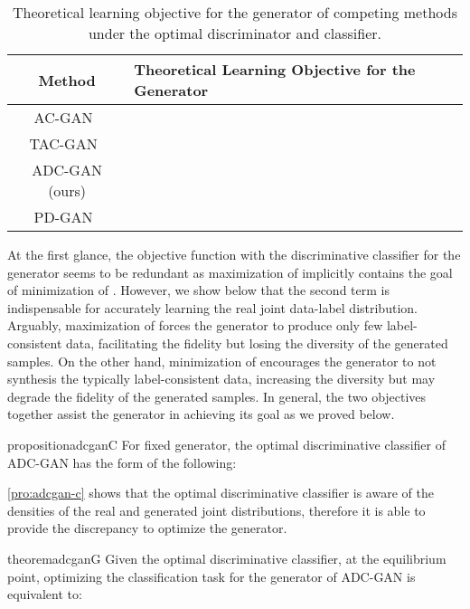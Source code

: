 \documentclass[nohyperref]{article}
\theoremstyle{plain}
\theoremstyle{definition}
\theoremstyle{remark}
\begin{document}
\begin{table*}[tbp]
\caption{Theoretical learning objective for the generator of competing methods under the optimal discriminator and classifier.}
\label{tbl:objectives}
\begin{center}
\begin{sc}
\begin{tabular}{cl}
\toprule
Method & Theoretical Learning Objective for the Generator \\
\midrule
AC-GAN~\cite{pmlr-v70-odena17a} &  \\
TAC-GAN~\cite{NEURIPS2019_4ea06fbc} &  \\
ADC-GAN (ours) &  \\
PD-GAN~\cite{miyato2018cgans} &  \\
\bottomrule
\end{tabular}
\end{sc}
\end{center}
\end{table*} 
At the first glance, the objective function with the discriminative classifier for the generator seems to be redundant as maximization of
 implicitly contains the goal of minimization of .
However, we show below that the second term is indispensable for accurately learning the real joint data-label distribution.
Arguably, maximization of
 forces the generator to produce only few label-consistent data, facilitating the fidelity but losing the diversity of the generated samples.
On the other hand, minimization of  encourages the generator to not synthesis the typically label-consistent data, increasing the diversity but may degrade the fidelity of the generated samples.
In general, the two objectives together assist the generator in achieving its goal as we proved below.

\begin{restatable}{proposition}{adcganC}\label{pro:adcgan-c}
For fixed generator, the optimal discriminative classifier of ADC-GAN has the form of the following:

\end{restatable}

\cref{pro:adcgan-c} shows that the optimal discriminative classifier is aware of the densities of the real and generated joint distributions, therefore it is able to provide the discrepancy  to optimize the generator.

\begin{restatable}{theorem}{adcganG}\label{thm:adcgan-g}
Given the optimal discriminative classifier, at the equilibrium point, optimizing the classification task for the generator of ADC-GAN is equivalent to:

\end{restatable}
\end{document}

